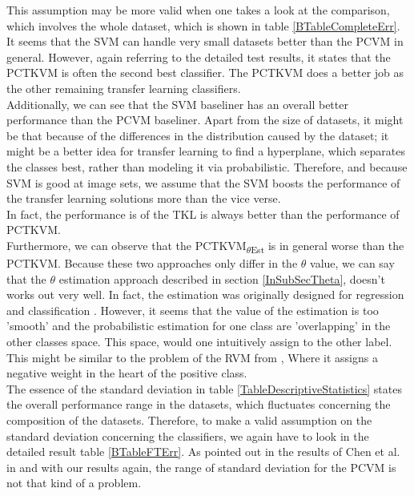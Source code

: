 This assumption may be more valid when one takes a look at the comparison, which involves the whole dataset, which is shown in table \ref{BTableCompleteErr}.
It seems that the \acs{SVM} can handle very small datasets better than the \acs{PCVM} in general.
However, again referring to the detailed test results, it states that the \acs{PCTKVM} is often the second best classifier.
The \acs{PCTKVM} does a better job as the other remaining transfer learning classifiers.\\
Additionally, we can see that the \acs{SVM} baseliner has an overall better performance than the \acs{PCVM} baseliner.
Apart from the size of datasets, it might be that because of the differences in the distribution caused by the dataset; it might be a better idea for transfer learning to find a hyperplane, which separates the classes best, rather than modeling it via probabilistic.
Therefore, and because \acs{SVM} is good at image sets, we assume that the \acs{SVM} boosts the performance of the transfer learning solutions more than the vice verse.\\
In fact, the performance is of the \acs{TKL} is always better than the performance of \acs{PCTKVM}.\\
Furthermore, we can observe that the \acs{PCTKVM}\textsubscript{$\theta$Est} is in general worse than the \acs{PCTKVM}. 
Because these two approaches only differ in the $\theta$ value, we can say that the $\theta$ estimation approach described in section \ref{InSubSecTheta}, doesn't works out very well.
In fact, the estimation was originally designed for regression and classification \cite{Kitayama.2011}. However, it seems that the value of the estimation is too 'smooth' and the probabilistic estimation for one class are 'overlapping' in the other classes space.
This space, would one intuitively assign to the other label.
This might be similar to the problem of the \acs{RVM} from \cite{Chen.2009}, Where it assigns a negative weight in the heart of the positive class.\\
The essence of the standard deviation in table \ref{TableDescriptiveStatistics} states the overall performance range in the datasets, which fluctuates concerning the composition of the datasets.
Therefore, to make a valid assumption on the standard deviation concerning the classifiers, we again have to look in the detailed result table \ref{BTableFTErr}.
As pointed out in the results of Chen et al. in \cite{Chen.2009} and with our results again, the range of standard deviation for the \acs{PCVM} is not that kind of a problem. 
